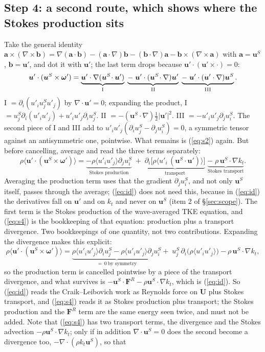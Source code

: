 \documentclass[10pt]{article}
\newcommand{\av}[1]{\langle #1\rangle}\newcommand{\uS}{\bm u^S}\newcommand{\WS}{\mathcal W_S}\newcommand{\PS}{\mathcal P_S}
\newcommand{\bu}{\bm u}\newcommand{\bU}{\bm U}\newcommand{\bxi}{\bm\xi}\newcommand{\dd}{\mathrm d}
\begin{document}
\subsection{Step 4: a second route, which shows where the Stokes production sits}
Take the general identity $\bm a\times(\nabla\times\bm b)=\nabla(\bm a\cdot\bm b)-(\bm a\cdot\nabla)\bm b-(\bm b\cdot\nabla)\bm a-\bm b\times(\nabla\times\bm a)$ with $\bm a=\uS$, $\bm b=\bu'$, and dot it with $\bu'$; the last term drops because $\bu'\cdot(\bu'\times\cdot)=0$:
\[
\bu'\cdot(\uS\times\bm\omega')=\underbrace{\bu'\cdot\nabla(\uS\!\cdot\bu')}_{\rm I}\;\underbrace{-\;\bu'\cdot(\uS\!\cdot\nabla)\bu'}_{\rm II}\;\underbrace{-\;\bu'\cdot(\bu'\cdot\nabla)\uS}_{\rm III}.
\]
I $=\partial_i(u'_iu^S_ju'_j)$ by $\nabla\cdot\bu'=0$; expanding the product, I $=u^S_j\partial_i(u'_iu'_j)+u'_iu'_j\partial_iu^S_j$. II $=-(\uS\cdot\nabla)\tfrac12|\bu'|^2$. III $=-u'_iu'_j\partial_ju^S_i$. The second piece of I and III add to $u'_iu'_j(\partial_iu^S_j-\partial_ju^S_i)=0$, a symmetric tensor against an antisymmetric one, pointwise. What remains is (\ref{eq:s2}) again. But before cancelling, average and read the three terms separately:
\begin{equation}
\rho\av{\bu'\cdot(\uS\times\bm\omega')}=\underbrace{-\rho\av{u'_iu'_j}\partial_ju^S_i}_{\text{Stokes production}}\;+\;\underbrace{\partial_i\big[\rho\av{u'_i\,(\uS\!\cdot\bu')}\big]}_{\text{transport}}\;\underbrace{-\;\rho\,\uS\!\cdot\nabla k_t}_{\text{Stokes transport}} .
\label{eq:s4}
\end{equation}
Averaging the production term uses that the gradient $\partial_ju^S_i$, and not only $\uS$ itself, passes through the average; (\ref{eq:id}) does not need this, because in (\ref{eq:id}) the derivatives fall on $\bu'$ and on $k_t$ and never on $\uS$ (item 2 of \S\ref{sec:scope}). The first term is the Stokes production of the wave-averaged TKE equation, and (\ref{eq:s4}) is the bookkeeping of that equation: production plus a transport divergence. Two bookkeepings of one quantity, not two contributions. Expanding the divergence makes this explicit:
\[
\rho\av{\bu'\cdot(\uS\times\bm\omega')}=\underbrace{\rho\av{u'_iu'_j}\partial_iu^S_j-\rho\av{u'_iu'_j}\partial_ju^S_i}_{=\,0\ \text{by symmetry}}+\;u^S_j\,\partial_i\big(\rho\av{u'_iu'_j}\big)-\rho\,\uS\!\cdot\nabla k_t ,
\]
so the production term is cancelled pointwise by a piece of the transport divergence, and what survives is $-\uS\!\cdot\bm F^R-\rho\uS\!\cdot\nabla k_t$, which is (\ref{eq:id}). So (\ref{eq:id}) reads the Craik--Leibovich work as Reynolds force on $\bU$ plus Stokes transport, and (\ref{eq:s4}) reads it as Stokes production plus transport; the Stokes production and the $\bm F^R$ term are the same energy seen twice, and must not be added. Note that (\ref{eq:s4}) has two transport terms, the divergence and the Stokes advection $-\rho\uS\!\cdot\nabla k_t$; only if in addition $\nabla\cdot\uS=0$ does the second become a divergence too, $-\nabla\cdot(\rho k_t\uS)$, so that
\end{document}
